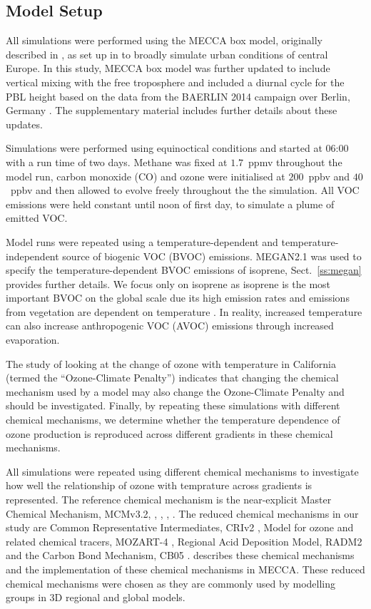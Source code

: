 \subsection{Model Setup} \label{ss:model_setup}
All simulations were performed using the MECCA box model, originally described in \citet{Sander:2005}, as set up in \citet{Coates:2015} to broadly simulate urban conditions of central Europe.
In this study, MECCA box model was further updated to include vertical mixing with the free troposphere and included a diurnal cycle for the PBL height based on the data from the BAERLIN 2014 campaign over Berlin, Germany \citep{Bonn:2016}. 
The supplementary material includes further details about these updates.

Simulations were performed using equinoctical conditions and started at 06:00 with a run time of two days.
Methane was fixed at $1.7$~ppmv throughout the model run, carbon monoxide (CO) and ozone were initialised at $200$~ppbv and $40$~ppbv and then allowed to evolve freely throughout the the simulation.
All VOC emissions were held constant until noon of first day, to simulate a plume of emitted VOC.

Model runs were repeated using a temperature-dependent and temperature-independent source of biogenic VOC (BVOC) emissions. 
MEGAN2.1 \citep{Guenther:2012} was used to specify the temperature-dependent BVOC emissions of isoprene, Sect.~\ref{ss:megan} provides further details. 
We focus only on isoprene as isoprene is the most important BVOC on the global scale due its high emission rates and emissions from vegetation are dependent on temperature \citep{Guenther:2006}. 
In reality, increased temperature can also increase anthropogenic VOC (AVOC) emissions through increased evaporation.


The study of \citet{Rasmussen:2013} looking at the change of ozone with temperature in California (termed the ``Ozone-Climate Penalty'') indicates that changing the chemical mechanism used by a model may also change the Ozone-Climate Penalty and should be investigated.
Finally, by repeating these simulations with different chemical mechanisms, we determine whether the temperature dependence of ozone production is reproduced across different  gradients in these chemical mechanisms.

All simulations were repeated using different chemical mechanisms to investigate how well the relationship of ozone with temprature across  gradients is represented.
The reference chemical mechanism is the near-explicit Master Chemical Mechanism, MCMv3.2, \citep{Jenkin:1997}, \citep{Jenkin:2003}, \citep{Saunders:2003}, \citep{MCM_Site}.
The reduced chemical mechanisms in our study are Common Representative Intermediates, CRIv2 \citep{Jenkin:2008}, Model for ozone and related chemical tracers, MOZART-4 \citep{Emmons:2010}, Regional Acid Deposition Model, RADM2 \citep{Stockwell:1990} and the Carbon Bond Mechanism, CB05 \citep{Yarwood:2005}. 
\citet{Coates:2015} describes these chemical mechanisms and the implementation of these chemical mechanisms in MECCA.
These reduced chemical mechanisms were chosen as they are commonly used by modelling groups in 3D regional and global models.

